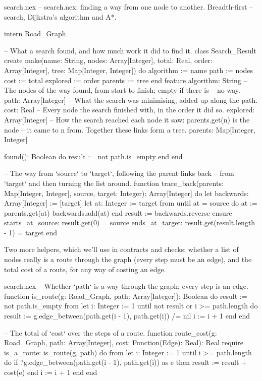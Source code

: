 \begin{newfile}{search.nex}
-- search.nex: finding a way from one node to another. Breadth-first
-- search, Dijkstra's algorithm and A*.

intern Road_Graph

-- What a search found, and how much work it did to find it.
class Search_Result
create
  make(name: String, nodes: Array[Integer], total: Real,
    order: Array[Integer], tree: Map[Integer, Integer]) do
    algorithm := name
    path := nodes
    cost := total
    explored := order
    parents := tree
  end
feature
  algorithm: String
  -- The nodes of the way found, from start to finish; empty if there is
  -- no way.
  path: Array[Integer]
  -- What the search was minimising, added up along the path.
  cost: Real
  -- Every node the search finished with, in the order it did so.
  explored: Array[Integer]
  -- How the search reached each node it saw: parents.get(n) is the node
  -- it came to n from. Together these links form a tree.
  parents: Map[Integer, Integer]

  found(): Boolean do
    result := not path.is_empty
  end
end

-- The way from `source` to `target`, following the parent links back
-- from `target` and then turning the list around.
function trace_back(parents: Map[Integer, Integer], source, target: Integer): Array[Integer] do
  let backwards: Array[Integer] := [target]
  let at: Integer := target
  from
  until
    at = source
  do
    at := parents.get(at)
    backwards.add(at)
  end
  result := backwards.reverse
ensure
  starts_at_source: result.get(0) = source
  ends_at_target: result.get(result.length - 1) = target
end
\end{newfile}

Two more helpers, which we'll use in contracts and checks: whether a list
of nodes really is a route through the graph (every step must be an
edge), and the total cost of a route, for any way of costing an edge.

\begin{append}{search.nex}
-- Whether `path` is a way through the graph: every step is an edge.
function is_route(g: Road_Graph, path: Array[Integer]): Boolean do
  result := not path.is_empty
  from
    let i: Integer := 1
  until
    not result or i >= path.length
  do
    result := g.edge_between(path.get(i - 1), path.get(i)) /= nil
    i := i + 1
  end
end

-- The total of `cost` over the steps of a route.
function route_cost(g: Road_Graph, path: Array[Integer], cost: Function(Edge): Real): Real
require
  is_a_route: is_route(g, path)
do
  from
    let i: Integer := 1
  until
    i >= path.length
  do
    if ?g.edge_between(path.get(i - 1), path.get(i)) as e then
      result := result + cost(e)
    end
    i := i + 1
  end
end
\end{append}

